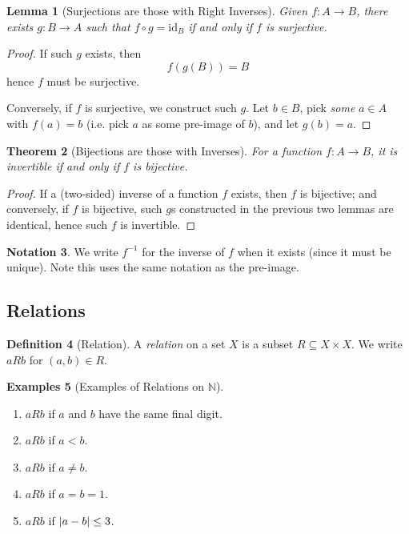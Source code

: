 \documentclass{article}
\newtheorem{theorem}{Theorem}[section]
\newtheorem{lemma}[theorem]{Lemma}
\theoremstyle{definition}
\newtheorem{definition}[theorem]{Definition}
\newtheorem{examples}[theorem]{Examples}
\newtheorem{notation}[theorem]{Notation}
\theoremstyle{remark}
\DeclarePairedDelimiter{\abs}{\lvert}{\rvert}
\newcommand{\pqty}[1]{\left(#1\right)}
\newcommand{\functiondomain}[3]{#1:#2\to #3}
\newcommand{\inverse}{^{-1}}
\newcommand{\identity}{\mathrm{id}}
\newcommand{\NN}{\mathbb{N}}
\begin{document}
\begin{lemma}[Surjections are those with Right Inverses]
    Given \(\functiondomain{f}{A}{B}\), there exists \(\functiondomain{g}{B}{A}\) such that \(f \circ g = \identity_B\) if and only if \(f\) is surjective.
\end{lemma}

\begin{proof}
    If such \(g\) exists, then
    \[
        f \pqty{g \pqty{B}} = B
    \]
    hence \(f\) must be surjective.

    Conversely, if \(f\) is surjective, we construct such \(g\). Let \(b \in B\), pick \emph{some} \(a \in A\) with \(f\pqty{a} = b\) (i.e. pick \(a\) as some pre-image of \(b\)), and let \(g \pqty{b} = a\).
\end{proof}

\begin{theorem}[Bijections are those with Inverses]
    For a function \(\functiondomain{f}{A}{B}\), it is invertible if and only if \(f\) is bijective.
\end{theorem}

\begin{proof}
    If a (two-sided) inverse of a function \(f\) exists, then \(f\) is bijective; and conversely, if \(f\) is bijective, such \(g\)s constructed in the previous two lemmas are identical, hence such \(f\) is invertible.
\end{proof}

\begin{notation}
    We write \(f\inverse\) for the inverse of \(f\) when it exists (since it must be unique). Note this uses the same notation as the pre-image.
\end{notation}

\subsection{Relations}
\label{sec:relations}

\begin{definition}[Relation]
    A \emph{relation} on a set \(X\) is a subset \(R \subseteq X \times X\). We write \(aRb\) for \(\pqty{a, b} \in R\).
\end{definition}

\begin{examples}[Examples of Relations on \(\NN\)]
    \begin{enumerate}
        \item \(aRb\) if \(a\) and \(b\) have the same final digit.
        \item \(aRb\) if \(a < b\).
        \item \(aRb\) if \(a \neq b\).
        \item \(aRb\) if \(a = b = 1\).
        \item \(aRb\) if \(\abs{a - b} \leq 3\).
    \end{enumerate}
\end{examples}
\end{document}
